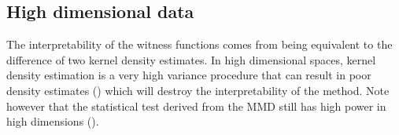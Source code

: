 \documentclass{article} %
\begin{document}
%
%
%
%
%

\subsection{High dimensional data}

The interpretability of the witness functions comes from being equivalent to the difference of two kernel density estimates.
In high dimensional spaces, kernel density estimation is a very high variance procedure that can result in poor density estimates () which will destroy the interpretability of the method.
Note however that the statistical test derived from the MMD still has high power in high dimensions ().
\end{document}
